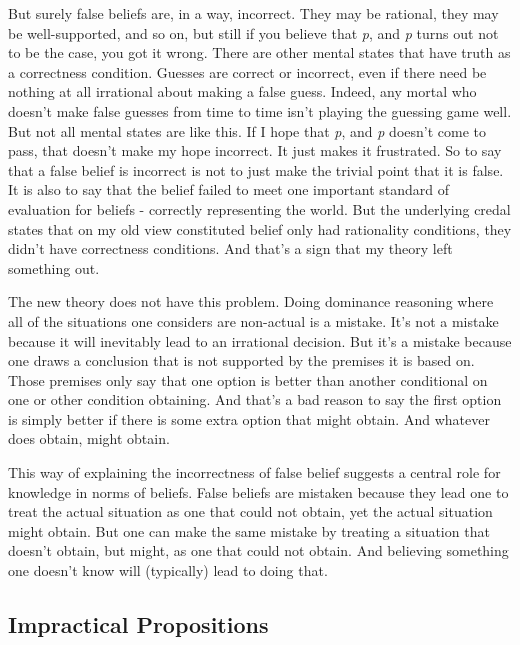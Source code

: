 \documentclass[
  12pt,
  letterpaper,
]{scrbook}
\begin{document}
But surely false beliefs are, in a way, incorrect. They may be rational,
they may be well-supported, and so on, but still if you believe that
\emph{p}, and \emph{p} turns out not to be the case, you got it wrong.
There are other mental states that have truth as a correctness
condition. Guesses are correct or incorrect, even if there need be
nothing at all irrational about making a false guess. Indeed, any mortal
who doesn't make false guesses from time to time isn't playing the
guessing game well. But not all mental states are like this. If I hope
that \emph{p}, and \emph{p} doesn't come to pass, that doesn't make my
hope incorrect. It just makes it frustrated. So to say that a false
belief is incorrect is not to just make the trivial point that it is
false. It is also to say that the belief failed to meet one important
standard of evaluation for beliefs - correctly representing the world.
But the underlying credal states that on my old view constituted belief
only had rationality conditions, they didn't have correctness
conditions. And that's a sign that my theory left something out.

The new theory does not have this problem. Doing dominance reasoning
where all of the situations one considers are non-actual is a mistake.
It's not a mistake because it will inevitably lead to an irrational
decision. But it's a mistake because one draws a conclusion that is not
supported by the premises it is based on. Those premises only say that
one option is better than another conditional on one or other condition
obtaining. And that's a bad reason to say the first option is simply
better if there is some extra option that might obtain. And whatever
does obtain, might obtain.

This way of explaining the incorrectness of false belief suggests a
central role for knowledge in norms of beliefs. False beliefs are
mistaken because they lead one to treat the actual situation as one that
could not obtain, yet the actual situation might obtain. But one can
make the same mistake by treating a situation that doesn't obtain, but
might, as one that could not obtain. And believing something one doesn't
know will (typically) lead to doing that.

\subsection{Impractical Propositions}\label{sec-meimpractical}
\end{document}
